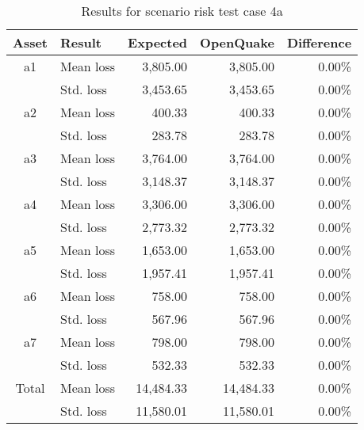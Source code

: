 \begin{table}[htbp]

\centering
\begin{tabular}{ c l r r r }

\hline
\rowcolor{anti-flashwhite}
\bf{Asset} & \bf{Result} & \bf{Expected} & \bf{OpenQuake} & \bf{Difference}\\
\hline
a1 & Mean loss & 3,805.00 & 3,805.00 & 0.00\% \\
 & Std. loss & 3,453.65 & 3,453.65 & 0.00\% \\
\hline
a2 & Mean loss & 400.33 & 400.33 & 0.00\% \\
 & Std. loss & 283.78 & 283.78 & 0.00\% \\
\hline
a3 & Mean loss & 3,764.00 & 3,764.00 & 0.00\% \\
 & Std. loss & 3,148.37 & 3,148.37 & 0.00\% \\
\hline
a4 & Mean loss & 3,306.00 & 3,306.00 & 0.00\% \\
 & Std. loss & 2,773.32 & 2,773.32 & 0.00\% \\
\hline
a5 & Mean loss & 1,653.00 & 1,653.00 & 0.00\% \\
 & Std. loss & 1,957.41 & 1,957.41 & 0.00\% \\
\hline
a6 & Mean loss & 758.00 & 758.00 & 0.00\% \\
 & Std. loss & 567.96 & 567.96 & 0.00\% \\
\hline
a7 & Mean loss & 798.00 & 798.00 & 0.00\% \\
 & Std. loss & 532.33 & 532.33 & 0.00\% \\
\hline
Total & Mean loss & 14,484.33 & 14,484.33 & 0.00\% \\
 & Std. loss & 11,580.01 & 11,580.01 & 0.00\% \\
\hline
\end{tabular}

\caption{Results for scenario risk test case 4a}
\label{tab:result-sr-4a}
\end{table}
